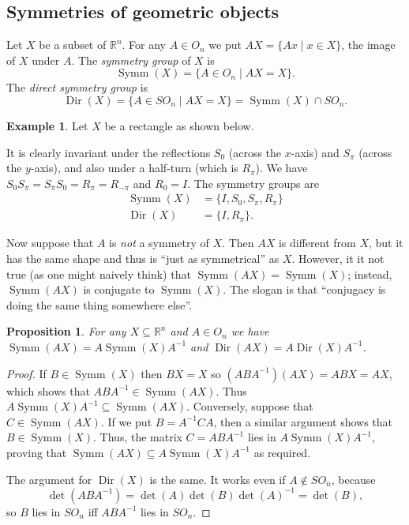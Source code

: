 \documentclass{amsart}
\DeclareMathOperator{\Dir}      {Dir}
\DeclareMathOperator{\Symm}     {Symm}
\newcommand{\R}         {{\mathbb{R}}}
\newcommand{\st}        {\;|\;}
\newcommand{\sse}       {\subseteq}
\renewcommand{\:}{\colon}
\newtheorem{proposition}[theorem]{Proposition}
\theoremstyle{definition}
\newtheorem{example}[theorem]{Example}
\begin{document}
\subsection{Symmetries of geometric objects}

Let $X$ be a subset of $\R^n$.  For any $A\in O_n$ we put
$AX=\{Ax\st x\in X\}$, the image of $X$ under $A$.  The \emph{symmetry
  group} of $X$ is
\[ \Symm(X) = \{A\in O_n\st AX=X\}. \]
The \emph{direct symmetry group} is
\[ \Dir(X) = \{A\in SO_n\st AX=X\} = \Symm(X)\cap SO_n. \]

\begin{example}
 Let $X$ be a rectangle as shown below.
 \begin{center}
 \end{center}
 It is clearly invariant under the reflections $S_0$ (across the
 $x$-axis) and $S_\pi$ (across the $y$-axis), and also under a
 half-turn (which is $R_\pi$).  We have
  $S_0S_\pi=S_\pi S_0=R_\pi=R_{-\pi}$ and $R_0=I$.  The symmetry groups
 are
 \begin{align*}
  \Symm(X) &= \{I,S_0,S_\pi,R_\pi\} \\
  \Dir(X)  &= \{I,R_\pi\}.
 \end{align*}
\end{example}

Now suppose that $A$ is \emph{not} a symmetry of $X$.  Then $AX$ is
different from $X$, but it has the same shape and thus is ``just as
symmetrical'' as $X$.  However, it it not true (as one might naively
think) that $\Symm(AX)=\Symm(X)$; instead, $\Symm(AX)$ is conjugate to
$\Symm(X)$.  The slogan is that ``conjugacy is doing the same thing
somewhere else''.


\begin{proposition}\label{prop-Symm-AX}
 For any $X\sse\R^n$ and $A\in O_n$ we have
 $\Symm(AX)=A\Symm(X)A^{-1}$ and $\Dir(AX)=A\Dir(X)A^{-1}$.
\end{proposition}
\begin{proof}
 If $B\in\Symm(X)$ then $BX=X$ so $(ABA^{-1})(AX)=ABX=AX$, which shows
 that $ABA^{-1}\in\Symm(AX)$.  Thus $A\Symm(X)A^{-1}\sse\Symm(AX)$.
 Conversely, suppose that $C\in\Symm(AX)$.  If we put $B=A^{-1}CA$,
 then a similar argument shows that $B\in\Symm(X)$.  Thus, the matrix
 $C=ABA^{-1}$ lies in $A\Symm(X)A^{-1}$, proving that
 $\Symm(AX)\sse A\Symm(X)A^{-1}$ as required.

 The argument for $\Dir(X)$ is the same.  It works even if
 $A\not\in SO_n$, because
 \[ \det(ABA^{-1})=\det(A)\det(B)\det(A)^{-1}=\det(B), \]
 so $B$ lies in $SO_n$ iff $ABA^{-1}$ lies in $SO_n$.
\end{proof}
\end{document}
